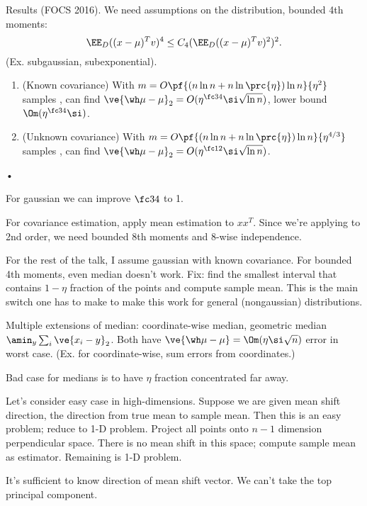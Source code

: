 Results (FOCS 2016). We need assumptions on the distribution, bounded 4th moments:
$$
\EE_D((x-\mu)^Tv)^4 \le C_4 (\EE_D ((x-\mu)^Tv)^2)^2.
$$
(Ex. subgaussian, subexponential).
\begin{thm}
\begin{enumerate}
\item
(Known covariance)
With 
$m=O\pf{(n\ln n + n\ln \prc{\eta} )\ln n}{\eta^2}$ samples
, can find $\ve{\wh \mu - \mu}_2 = O(\eta^{\fc 34}\si \sqrt{\ln n})$, lower bound $\Om(\eta^{\fc 34}\si)$. 
\item
(Unknown covariance)
With 
$m=O\pf{(n\ln n + n\ln \prc{\eta} )\ln n}{\eta^{4/3}}$ samples
, can find $\ve{\wh \mu - \mu}_2 = O(\eta^{\fc 12}\si \sqrt{\ln n})$.
\end{enumerate}•
\end{thm}
For gaussian we can improve $\fc 34$ to 1.

For covariance estimation, apply mean estimation to $xx^T$.  Since we're applying to 2nd order, we need bounded 8th moments and 8-wise independence. 

For the rest of the talk, I assume gaussian with known covariance. 
For bounded 4th moments, even median doesn't work. Fix: find the smallest interval that contains $1-\eta$ fraction of the points and compute sample mean. This is the main switch one has to make to make this work for general  (nongaussian) distributions.

Multiple extensions of median: coordinate-wise median, geometric median $\amin_y\sum_i \ve{x_i-y}_2$. Both have $\ve{\wh \mu - \mu} = \Om(\eta \si\sqrt n)$ error in worst case. (Ex. for coordinate-wise, sum errors from coordinates.)

Bad case for medians is to have $\eta$ fraction concentrated far away. 

Let's consider easy case in high-dimensions. Suppose we are given mean shift direction, the direction from true mean to sample mean. Then this is an easy problem; reduce to 1-D problem. Project all points onto $n-1$ dimension perpendicular space. There is no mean shift in this space;  compute sample mean as estimator. Remaining is 1-D problem. 

It's sufficient to know direction of mean shift vector. We can't take the top principal component.

